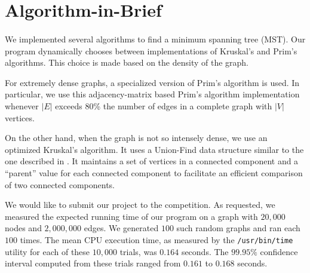\section{Algorithm-in-Brief}
\label{sec:algbrief}

\paragraph{}
We implemented several algorithms to find a minimum spanning tree (MST).  Our
program dynamically chooses between implementations of Kruskal's and Prim's
algorithms.  This choice is made based on the density of the graph.

For extremely dense graphs, a specialized version of Prim's algorithm is used.
In particular, we use this adjacency-matrix based Prim's algorithm
implementation whenever $|E|$ exceeds $80$\% the number of edges in a complete
graph with $|V|$ vertices.

On the other hand, when the graph is not so intensely dense, we use an optimized
Kruskal's algorithm.  It uses a Union-Find data structure similar to the one
described in \cite{algdesign}.  It maintains a set of vertices in a connected
component and a ``parent'' value for each connected component to facilitate an
efficient comparison of two connected components.

We would like to submit our project to the competition. As requested, we
measured the expected running time of our program on a graph with $20,000$ nodes
and $2,000,000$ edges.  We generated $100$ such random graphs and ran each $100$
times.  The mean CPU execution time, as measured by the \texttt{/usr/bin/time}
utility for each of these $10,000$ trials, was $0.164$ seconds.  The $99.95\%$
confidence interval computed from these trials ranged from $0.161$ to $0.168$
seconds.
